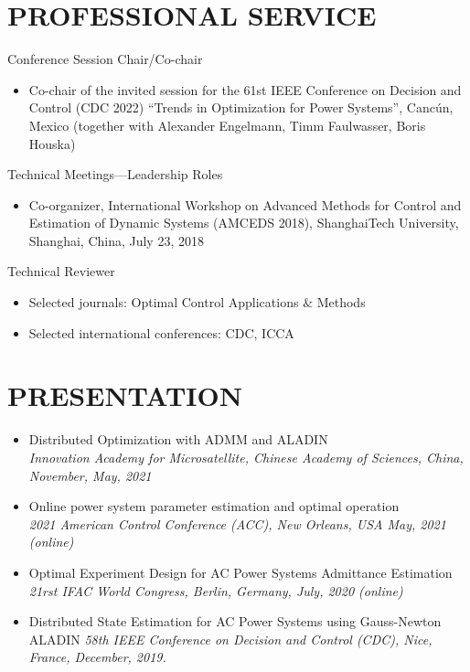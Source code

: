 \documentclass[paper=a4,fontsize=11pt]{scrartcl} %
\newcommand{\NewPart}[1]{\section*{\uppercase{#1}}}
\newcommand{\EducationEntry}[4]{
		\noindent \textbf{#1} \hfill      %
		\colorbox{White}{%
			\parbox{5cm}{%
			\hfill\color{Black}#2}} \par  %
		\noindent \textit{#3} \par        %
		\noindent\hangindent=2em\hangafter=0 \small #4 %
		\normalsize \par}
\begin{document}
\NewPart{Professional Service}{Conference Session Chair/Co-chair}
%
\begin{itemize}
	\item{Co-chair of the invited session for the 61st
		IEEE Conference on Decision and Control (CDC 2022)
		“Trends in Optimization for Power Systems”, Canc\'un, Mexico} (together with Alexander Engelmann, Timm Faulwasser, Boris Houska)
	\end{itemize}
{Technical Meetings—Leadership Roles}
\begin{itemize}
\item{Co-organizer, International Workshop on Advanced Methods for Control and Estimation of Dynamic
	Systems (AMCEDS 2018), ShanghaiTech University, Shanghai, China, July 23, 2018}
\end{itemize}
{Technical Reviewer}
\begin{itemize}
	\item Selected journals: Optimal Control Applications $\&$ Methods
	\item Selected international conferences: CDC, ICCA
\end{itemize}

\NewPart{PRESENTATION}{}
\begin{itemize}
	\item  {
		{Distributed Optimization with ADMM and	ALADIN}\\
		\emph{Innovation Academy for Microsatellite, Chinese Academy of Sciences, China, November, May, 2021 	} }
	\item  {
		{Online power system parameter estimation and optimal operation}\\
		\emph{2021 American Control Conference (ACC), New Orleans, USA May, 2021 (online)
	} }
	
	\item  {
		Optimal Experiment Design for AC Power Systems Admittance Estimation\\
		\emph{21rst IFAC World Congress, Berlin, Germany, July, 2020 (online)
	} }
	
	\item  {
		Distributed State Estimation for AC Power Systems using Gauss-Newton ALADIN 
		\emph{58th IEEE Conference on Decision and Control (CDC),
			Nice, France, December, 2019.} }
\end{itemize}
\end{document}
